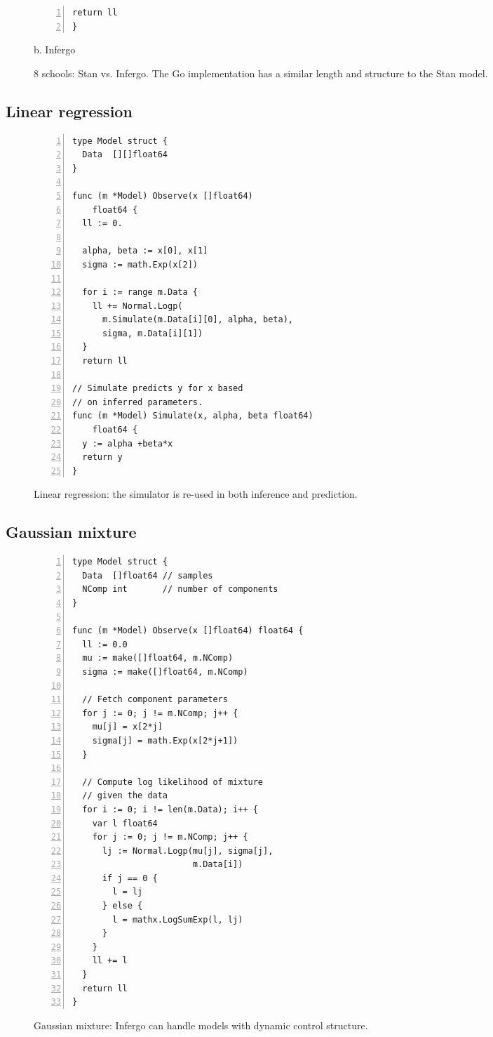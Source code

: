 \documentclass[sigplan,review,10pt,anonymous]{acmart}
\begin{document}
\begin{sloppypar}
\begin{figure*}
\begin{minipage}{0.45\textwidth}
\begin{lstlisting}[framexleftmargin=10pt,numbers=left]
  return ll
}
\end{lstlisting}
\centering
b. Infergo
	\end{minipage}
	\caption{8 schools: Stan vs. Infergo. The Go implementation
	has a similar length and structure to the Stan model.}
	\label{fig:8-schools}
\end{figure*}

\subsection{Linear regression}

\begin{figure}
\begin{lstlisting}[framexleftmargin=10pt,numbers=left]
type Model struct {
  Data  [][]float64
}

func (m *Model) Observe(x []float64)
    float64 {
  ll := 0.

  alpha, beta := x[0], x[1]
  sigma := math.Exp(x[2])

  for i := range m.Data {
    ll += Normal.Logp(
      m.Simulate(m.Data[i][0], alpha, beta),
      sigma, m.Data[i][1])
  }
  return ll

// Simulate predicts y for x based
// on inferred parameters.
func (m *Model) Simulate(x, alpha, beta float64)
    float64 {
  y := alpha +beta*x
  return y
}
\end{lstlisting}
\caption{Linear regression: the simulator is re-used in both
	inference and prediction.}
\label{fig:linear-regression}
\end{figure}

\subsection{Gaussian mixture}

\begin{figure}
\begin{lstlisting}[framexleftmargin=10pt,numbers=left]
type Model struct {
  Data  []float64 // samples
  NComp int       // number of components
}

func (m *Model) Observe(x []float64) float64 {
  ll := 0.0
  mu := make([]float64, m.NComp)
  sigma := make([]float64, m.NComp)

  // Fetch component parameters
  for j := 0; j != m.NComp; j++ {
    mu[j] = x[2*j]
    sigma[j] = math.Exp(x[2*j+1])
  }

  // Compute log likelihood of mixture
  // given the data
  for i := 0; i != len(m.Data); i++ {
    var l float64
    for j := 0; j != m.NComp; j++ {
      lj := Normal.Logp(mu[j], sigma[j],
	                    m.Data[i])
      if j == 0 {
        l = lj
      } else {
        l = mathx.LogSumExp(l, lj)
      }
    }
    ll += l
  }
  return ll
}
\end{lstlisting}
\caption{Gaussian mixture: Infergo can handle models with
	dynamic control structure.}
\label{fig:gaussian-mixture}
\end{figure}


\end{sloppypar}
\end{document}
